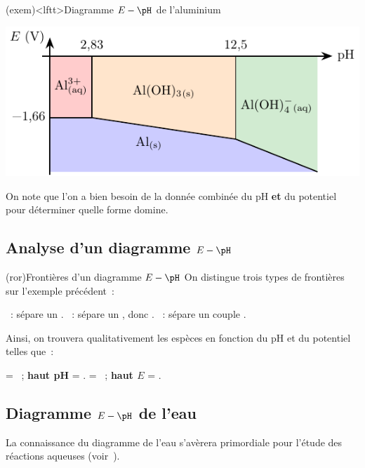 \documentclass[../../main/main.tex]{subfiles}
\begin{document}
\begin{tcb*}(exem)<lftt>{Diagramme $E-\pH$ de l'aluminium}
	\begin{center}
		\includegraphics[scale=1.5]{eph_al}
	\end{center}
	On note que l'on a bien besoin de la donnée combinée du pH \textbf{et} du
	potentiel pour déterminer quelle forme domine.
\end{tcb*}

\subsection{Analyse d'un diagramme $E-\pH$}
\begin{tcb*}[breakable](ror){Frontières d'un diagramme $E-\pH$}
	On distingue trois types de frontières sur l'exemple précédent~:
	\begin{itemize}
		~: sépare un .
		~: sépare un , donc .
		~: sépare un couple .
	\end{itemize}
	Ainsi, on trouvera qualitativement les espèces en fonction du pH et du
	potentiel telles que~:
	\begin{itemize}
		 = ~; \textbf{haut pH} = \xul{\psw{acide}}.
		 = ~; \textbf{haut $E$} =
		\xul{\psw{réducteur}}.
	\end{itemize}
\end{tcb*}

\subsection{Diagramme $E-\pH$ de l'eau}
La connaissance du diagramme de l'eau s'avèrera primordiale pour l'étude des
réactions aqueuses (voir~).
\end{document}
